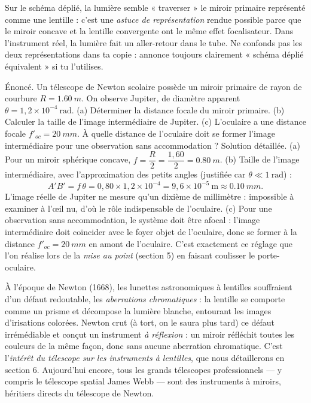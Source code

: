 \documentclass[11pt]{article}
\begin{document}
\begin{attention}
Sur le schéma déplié, la lumière semble « traverser » le miroir primaire représenté comme une lentille : c'est une \emph{astuce de représentation} rendue possible parce que le miroir concave et la lentille convergente ont le même effet focalisateur. Dans l'instrument réel, la lumière fait un aller-retour dans le tube. Ne confonds pas les deux représentations dans ta copie : annonce toujours clairement « schéma déplié équivalent » si tu l'utilises.
\end{attention}

\begin{exoresolu}
Énoncé. Un télescope de Newton scolaire possède un miroir primaire de rayon de courbure $R = \SI{1,60}{m}$. On observe Jupiter, de diamètre apparent $\theta = 1{,}2 \times 10^{-4}\ \text{rad}$. (a) Déterminer la distance focale du miroir primaire. (b) Calculer la taille de l'image intermédiaire de Jupiter. (c) L'oculaire a une distance focale $f'_{oc} = \SI{20}{mm}$. À quelle distance de l'oculaire doit se former l'image intermédiaire pour une observation sans accommodation ?
\tcblower
Solution détaillée. (a) Pour un miroir sphérique concave, $f = \dfrac{R}{2} = \dfrac{1{,}60}{2} = \SI{0,80}{m}$.
(b) Taille de l'image intermédiaire, avec l'approximation des petits angles (justifiée car $\theta \ll 1\ \text{rad}$) :
\[ A'B' = f\,\theta = 0{,}80 \times 1{,}2 \times 10^{-4} = 9{,}6 \times 10^{-5}\ \text{m} \approx \SI{0,10}{mm}. \]
L'image réelle de Jupiter ne mesure qu'un dixième de millimètre : impossible à examiner à l'œil nu, d'où le rôle indispensable de l'oculaire.
(c) Pour une observation sans accommodation, le système doit être afocal : l'image intermédiaire doit coïncider avec le foyer objet de l'oculaire, donc se former à la distance $f'_{oc} = \SI{20}{mm}$ en amont de l'oculaire. C'est exactement ce réglage que l'on réalise lors de la \emph{mise au point} (section 5) en faisant coulisser le porte-oculaire.
\end{exoresolu}

\begin{savaistu}
À l'époque de Newton (1668), les lunettes astronomiques à lentilles souffraient d'un défaut redoutable, les \emph{aberrations chromatiques} : la lentille se comporte comme un prisme et décompose la lumière blanche, entourant les images d'irisations colorées. Newton crut (à tort, on le saura plus tard) ce défaut irrémédiable et conçut un instrument \emph{à réflexion} : un miroir réfléchit toutes les couleurs de la même façon, donc sans aucune aberration chromatique. C'est l'\emph{intérêt du télescope sur les instruments à lentilles}, que nous détaillerons en section 6. Aujourd'hui encore, tous les grands télescopes professionnels — y compris le télescope spatial James Webb — sont des instruments à miroirs, héritiers directs du télescope de Newton.
\end{savaistu}
\end{document}
